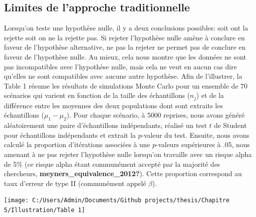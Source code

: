 \documentclass[
  english,
  man]{apa6}
\begin{document}
\hypertarget{limites-de-lapproche-traditionnelle}{%
\subsection{Limites de l'approche traditionnelle}\label{limites-de-lapproche-traditionnelle}}

Lorsqu'on teste une hypothèse nulle, il y a deux conclusions possibles: soit ont la rejette soit on ne la rejette pas. Si rejeter l'hypothèse nulle amène à conclure en faveur de l'hypothèse alternative, ne pas la rejeter ne permet pas de conclure en faveur de l'hypothèse nulle. Au mieux, cela nous montre que les données ne sont pas incompatibles avec l'hypothèse nulle, mais cela ne veut en aucun cas dire qu'elles ne sont compatibles avec aucune autre hypothèse. Afin de l'illustrer, la Table 1 résume les résultats de simulations Monte Carlo pour un ensemble de 70 scénarios qui varient en fonction de la taille des échantillons (\(n_j\)) et de la différence entre les moyennes des deux populations dont sont extraits les échantillons (\(\mu_1-\mu_2\)). Pour chaque scénario, à 5000 reprises, nous avons généré aléatoirement une paire d'échantillons indépendants, réalisé un test \(t\) de Student pour échantillons indépendants et extrait la \(p\)-valeur du test. Ensuite, nous avons calculé la proportion d'itérations associées à une \(p\)-valeurs supérieures à .05, nous amenant à ne pas rejeter l'hypothèse nulle lorsqu'on travaille avec un risque alpha de 5\% (ce risque alpha étant communément accepté par la majorité des chercheurs, \textbf{meyners\_equivalence\_2012?}). Cette proportion correspond au taux d'erreur de type II (communément appelé \(\beta\)).

\begin{flushleft}\texttt{[image: C:/Users/Admin/Documents/Github projects/thesis/Chapitre 5/Illustration/Table 1]} \end{flushleft}
\end{document}
